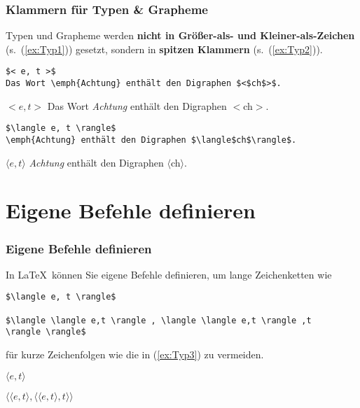 \begin{frame}[fragile]
\frametitle{Klammern für Typen \& Grapheme}


Typen und Grapheme werden \textbf{nicht in Größer-als- und Kleiner-als-Zeichen} (s.\ (\ref{ex:Typ1})) gesetzt, sondern in \textbf{spitzen Klammern} (s.\ (\ref{ex:Typ2})).

{\small
\begin{lstlisting}
$< e, t >$
Das Wort \emph{Achtung} enthält den Digraphen $<$ch$>$.
\end{lstlisting}
}

\ea\label{ex:Typ1} 
	\ea $< e, t >$
	\ex Das Wort \emph{Achtung} enthält den Digraphen $<$ch$>$.
	\z 
\z 


{\small
\begin{lstlisting}
$\langle e, t \rangle$
\emph{Achtung} enthält den Digraphen $\langle$ch$\rangle$.
\end{lstlisting}
}

\ea\label{ex:Typ2} 
	\ea $\langle e, t \rangle$
	\ex \emph{Achtung} enthält den Digraphen $\langle$ch$\rangle$.
	\z 
\z 

\end{frame}


\section{Eigene Befehle definieren}

\begin{frame}[fragile]
\frametitle{Eigene Befehle definieren}

In \LaTeX\ können Sie eigene Befehle definieren, um lange Zeichenketten wie

{\small
\begin{lstlisting}
$\langle e, t \rangle$

$\langle \langle e,t \rangle , \langle \langle e,t \rangle ,t 
\rangle \rangle$
\end{lstlisting}
}

für kurze Zeichenfolgen wie die in (\ref{ex:Typ3}) zu vermeiden.

\ea\label{ex:Typ3} 
	\ea $\langle e, t \rangle$
	
	\ex $\langle \langle e,t \rangle , \langle \langle e,t \rangle ,t \rangle \rangle$
	\z 
	
\z 

\end{frame}


